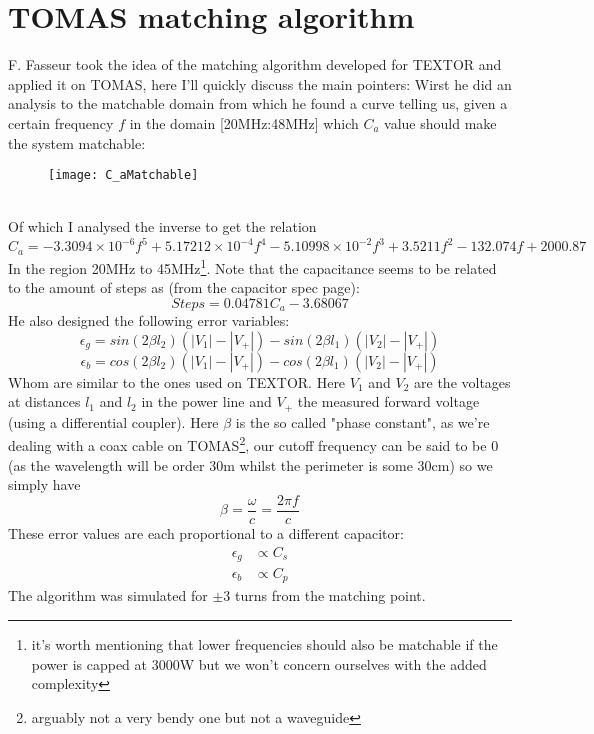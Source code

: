 \chapter{TOMAS matching algorithm}
F. Fasseur took the idea of the matching algorithm developed for TEXTOR\cite{DesignICRH} and applied it on TOMAS, here I'll quickly discuss the main pointers:
Wirst he did an analysis to the matchable domain from which he found a curve telling us,
given a certain frequency $f$ in the domain [20MHz:48MHz] which $C_a$ value should make the system matchable: 
\begin{figure}[h]
	\centering
	\texttt{[image: C\_aMatchable]}
\end{figure}\\
Of which I analysed the inverse to get the relation
\begin{equation}
	C_a = -3.3094\times 10^{-6}f^5 + 5.17212\times 10^{-4} f^4 -5.10998\times 10^{-2}f^3 + 3.5211f^2 -132.074f + 2000.87
	\label{eqn:C_a}
\end{equation}
In the region 20MHz to 45MHz\footnote{it's worth mentioning that lower
frequencies should also be matchable if the power is capped at 3000W but we
won't concern ourselves with the added complexity}.  Note that the capacitance
seems to be related to the amount of steps as (from the capacitor spec page):
\begin{equation}
	Steps = 0.04781 C_a - 3.68067
	\label{eqn:StepsC_a}
\end{equation}
\newpage
He also designed the following error variables:
\begin{equation}
\epsilon_g = sin(2\beta l_2 )(|V_1| - |V_+|) - sin(2\beta l_1 )(|V_2| - |V_+|)
\end{equation}
\begin{equation}
\epsilon_b = cos(2\beta l_2 )(|V_1| - |V_+|) - cos(2\beta l_1 )(|V_2| - |V_+|)
\end{equation}
Whom are similar to the ones used on TEXTOR. Here $V_1$ and $V_2$ are the voltages at distances $l_1$ and $l_2$ in the power line and $V_+$ the measured forward voltage (using a differential
coupler). 
Here $\beta$ is the so called "phase constant", as we're dealing with a coax cable on TOMAS\footnote{arguably not a very bendy one but not a waveguide}, our
cutoff frequency can be said to be 0 (as the wavelength will be order 30m whilst the perimeter is some 30cm) so we simply have
\begin{equation}
	\boxed{\beta = \frac{\omega}{c} = \frac{2\pi f}{c}}
\end{equation}
These error values are each proportional to a different capacitor:
\begin{eqnarray}
	\epsilon_g &\propto C_s\\
	\epsilon_b &\propto C_p
\end{eqnarray}
The algorithm was simulated for $\pm 3$ turns from the matching point.
